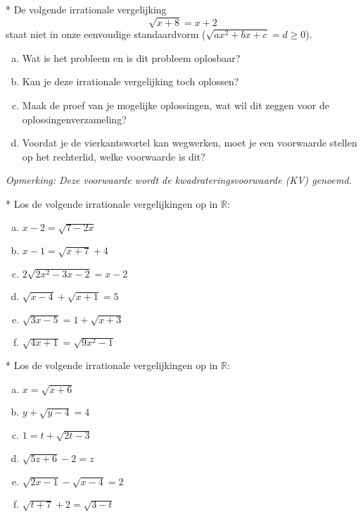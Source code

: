 \documentclass[12pt,twoside]{article}
\begin{document}
\begin{oefening}*
De volgende irrationale vergelijking
$$\sqrt{x+8}=x+2$$
staat niet in onze eenvoudige standaardvorm ($\sqrt{ax^2+bx+c}=d\geq0$).
\begin{enumerate}[(a)]
  \item Wat is het probleem en is dit probleem oplosbaar?
  \item Kan je deze irrationale vergelijking toch oplossen?
  \item Maak de proef van je mogelijke oplossingen, wat wil dit zeggen voor de oplossingenverzameling?
  \item Voordat je de vierkantswortel kan wegwerken, moet je een voorwaarde stellen op het rechterlid, welke voorwaarde is dit?
\end{enumerate}
{\em Opmerking: Deze voorwaarde wordt de kwadrateringsvoorwaarde (KV) genoemd.}
\end{oefening}

\begin{oefening}*
Los de volgende irrationale vergelijkingen op in $\mathbb{R}$:
\begin{multicols}{2}
\begin{enumerate}[(a)]
  \item $x-2=\sqrt{7-2x}$
  \item $x-1=\sqrt{x+7}+4$
  \item $2\sqrt{2x^2-3x-2}=x-2$
  \item $\sqrt{x-4}+\sqrt{x+1}=5$
  \item $\sqrt{3x-5}=1+\sqrt{x+3}$
  \item $\sqrt{4x+1}=\sqrt{9x^2-1}$
\end{enumerate}
\end{multicols}
\end{oefening}

\begin{oefening}* %
Los de volgende irrationale vergelijkingen op in $\mathbb{R}$:
\begin{multicols}{2}
\begin{enumerate}[(a)]
  \item $x=\sqrt{x+6}$
  \item $y+\sqrt{y-4}=4$
  \item $1=t+\sqrt{2t-3}$
  \item $\sqrt{5z+6}-2=z$
  \item $\sqrt{2x-1}-\sqrt{x-4}=2$
  \item $\sqrt{t+7}+2=\sqrt{3-t}$
\end{enumerate}
\end{multicols}
\end{oefening}
\end{document}
